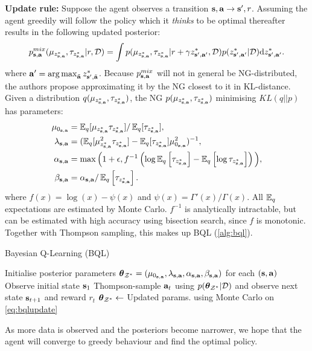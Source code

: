 \documentclass{article}
\begin{document}
\begin{appendices}
\textbf{Update rule:} Suppose the agent observes a transition $\s, \ac \to \ns, r$. Assuming the agent greedily will follow the policy which it \textit{thinks} to be optimal thereafter results in the following updated posterior:
\begin{align}\label{eq:mixture}
p^{mix}_{\s, \ac}(\bqlmu, \bqltau | r, \data) = \int p(\bqlmu, \bqltau | r + \gamma \zonb, \data) p(\zonb | \data) \dint \zonb.
\end{align}
where $\ac' = \argmax_{\tilde{\ac}} z^*_{\ns, \tilde{\ac}}$. Because $p^{mix}_{\s, \ac}$ will not in general be NG-distributed, the authors propose approximating it by the NG closest to it in KL-distance. Given a distribution $q(\bqlmu, \bqltau)$, the NG $p(\bqlmu, \bqltau)$ minimising $KL(q || p)$ has parameters:
\begin{equation}
\begin{aligned} \label{eq:bqlupdate}
\bqlmuzero &= \E_q[\bqlmu \bqltau] / \E_q[\bqltau], \\
\bqllambda &= (\E_q[\bqlmu^2 \bqltau] - \E_q[\bqltau] \mu_{0_{\s, \ac}}^2)^{-1},\\
\bqlalpha &= \max \Big(1 + \epsilon, f^{-1}\rdb{\log \E_q\sqb{\bqltau} - \E_q\sqb{\log \bqltau}}\Big), \\
\bqlbeta &= \bqlalpha / \E_q\sqb{\bqltau}.
\end{aligned}
\end{equation}
where $f(x) = \log(x) - \psi(x)$ and $\psi(x) = \Gamma'(x) / \Gamma(x)$. All $\E_q$ expectations are estimated by Monte Carlo. $f^{-1}$ is analytically intractable, but can be estimated with high accuracy using bisection search, since $f$ is monotonic. Together with Thompson sampling, this makes up BQL (\cref{alg:bql}).

\begin{algorithm}
  \caption{Bayesian Q-Learning (BQL)}\label{alg:bql}
  \begin{algorithmic}[1]
\State Initialise posterior parameters $\thetamczo = (\mu_{0_{\s, \ac}}, \lambda_{\s, \ac}, \alpha_{\s, \ac}, \beta_{\s, \ac})$ for each $(\s, \ac)$
 \State Observe initial state $\s_1$
  \State Thompson-sample $\ac_t$ using $p(\thetamczo | \data)$ and observe next state $\s_{t+1}$ and reward $r_t$
  \State $\thetamczo \leftarrow $ Updated params. using Monte Carlo on \cref{eq:bqlupdate}
 \EndFor
  \end{algorithmic}
\end{algorithm}

As more data is observed and the posteriors become narrower, we hope that the agent will converge to greedy behaviour and find the optimal policy.


\end{appendices}
\end{document}
